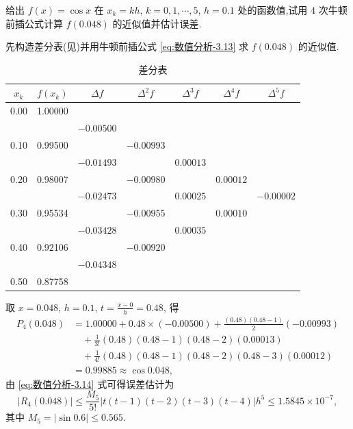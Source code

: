 \documentclass[../../main.tex]{subfiles}%
\begin{document}
\begin{example}
给出 $f(x) = \cos x$ 在 $x_k = kh$, $k = 0, 1, \cdots, 5$, $h = 0.1$ 处的函数值,试用 4 次牛顿前插公式计算 $f(0.048)$ 的近似值并估计误差.
\end{example}
\begin{solution}

先构造差分表(见)并用牛顿前插公式 \eqref{eq:数值分析-3.13} 求 $f(0.048)$ 的近似值.
\begin{table}[H]
\centering
\caption{差分表}
\label{tab:difference-table12312344343452345634456}
\begin{tabular}{c c c c c c c}
\toprule
$x_k$ & $f(x_k)$ & $\Delta f$ & $\Delta^2 f$ & $\Delta^3 f$ & $\Delta^4 f$ & $\Delta^5 f$ \\
\midrule
0.00 & 1.00000 &  &  &  &  &  \\
&  & $-0.00500$ &  &  &  &  \\
0.10 & 0.99500 &  & $-0.00993$ &  &  &  \\
&  & $-0.01493$ &  & $0.00013$ &  &  \\
0.20 & 0.98007 &  & $-0.00980$ &  & $0.00012$ &  \\
&  & $-0.02473$ &  & $0.00025$ &  & $-0.00002$ \\
0.30 & 0.95534 &  & $-0.00955$ &  & $0.00010$ &  \\
&  & $-0.03428$ &  & $0.00035$ &  &  \\
0.40 & 0.92106 &  & $-0.00920$ &  &  &  \\
&  & $-0.04348$ &  &  &  &  \\
0.50 & 0.87758 &  &  &  &  &  \\
\bottomrule
\end{tabular}
\end{table}
取 $x = 0.048$, $h = 0.1$, $t = \frac{x - 0}{h} = 0.48$, 得
\begin{align*}
P_4(0.048) &= 1.00000 + 0.48 \times (-0.00500) + \frac{(0.48)(0.48 - 1)}{2}(-0.00993) \\
&\quad + \frac{1}{3!}(0.48)(0.48 - 1)(0.48 - 2)(0.00013) \\
&\quad + \frac{1}{4!}(0.48)(0.48 - 1)(0.48 - 2)(0.48 - 3)(0.00012) \\
&= 0.99885 \approx \cos 0.048,
\end{align*}
由 \eqref{eq:数值分析-3.14} 式可得误差估计为
\[
|R_4(0.048)| \leqslant \frac{M_5}{5!} | t(t - 1)(t - 2)(t - 3)(t - 4) | h^5 \leqslant 1.5845 \times 10^{-7},
\]
其中 $M_5 = |\sin 0.6| \leqslant 0.565$.

\end{solution}
\end{document}
